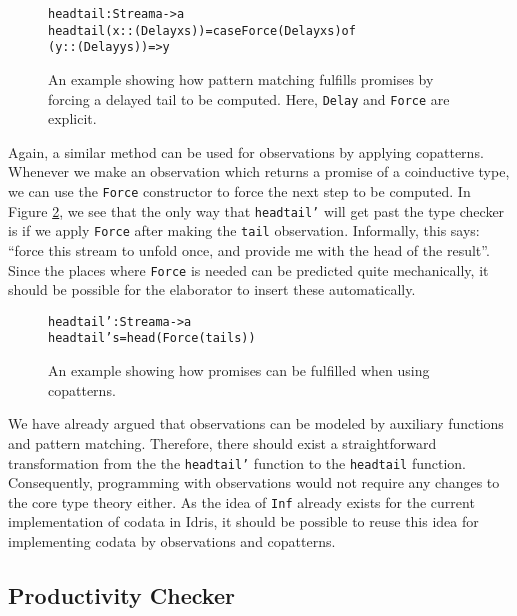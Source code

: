 \begin{figure}
\begin{alltt}
headtail : Stream a -> a
headtail (x :: (Delay xs)) = case Force (Delay xs) of
                               (y :: (Delay ys)) => y
\end{alltt}
\caption{An example showing how pattern matching fulfills promises by forcing a delayed tail to be computed. Here, \texttt{Delay} and \texttt{Force} are explicit.}
\label{fig:headtail}
\end{figure}

Again, a similar method can be used for observations by applying copatterns. Whenever we make an observation which returns a promise of a coinductive type,
we can use the \texttt{Force} constructor to force the next step to be computed. In Figure \ref{fig:headtail_copatterns}, we see that the only way that \texttt{headtail'} will get past the type checker is if we apply \texttt{Force} after making the \texttt{tail} observation. Informally, this says: ``force this stream to unfold once, and provide me with the head of the result''. Since the places where \texttt{Force} is needed can be predicted quite mechanically, it should be possible for the elaborator to insert these automatically.

\begin{figure}
\begin{alltt}
headtail' : Stream a -> a
headtail' s = head (Force (tail s))
\end{alltt}
\caption{An example showing how promises can be fulfilled when using copatterns.}
\label{fig:headtail_copatterns}
\end{figure}

We have already argued that observations can be modeled by auxiliary functions and pattern matching. Therefore, there should exist a straightforward transformation from the the \texttt{headtail'} function to the \texttt{headtail} function. Consequently, programming with observations would not require any changes to the core type theory either. As the idea of \texttt{Inf} already exists for the current implementation of codata in Idris, it should be possible to reuse this idea for implementing codata by observations and copatterns.

\subsection{Productivity Checker}


